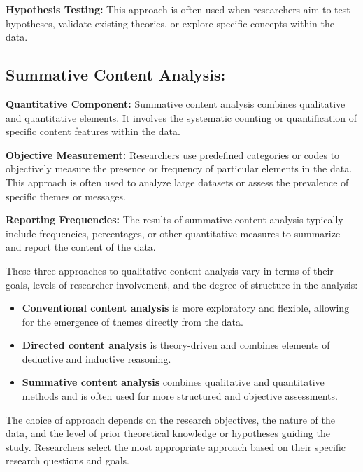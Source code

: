 \documentclass[
  b5paper]{book}
\begin{document}
\textbf{Hypothesis Testing:} This approach is often used when researchers aim to test hypotheses, validate existing theories, or explore specific concepts within the data.

\hypertarget{summative-content-analysis}{%
\subsection*{\texorpdfstring{\textbf{Summative Content Analysis:}}{Summative Content Analysis:}}\label{summative-content-analysis}}

\textbf{Quantitative Component:} Summative content analysis combines qualitative and quantitative elements. It involves the systematic counting or quantification of specific content features within the data.

\textbf{Objective Measurement:} Researchers use predefined categories or codes to objectively measure the presence or frequency of particular elements in the data. This approach is often used to analyze large datasets or assess the prevalence of specific themes or messages.

\textbf{Reporting Frequencies:} The results of summative content analysis typically include frequencies, percentages, or other quantitative measures to summarize and report the content of the data.

These three approaches to qualitative content analysis vary in terms of their goals, levels of researcher involvement, and the degree of structure in the analysis:

\begin{itemize}
\item
  \textbf{Conventional content analysis} is more exploratory and flexible, allowing for the emergence of themes directly from the data.
\item
  \textbf{Directed content analysis} is theory-driven and combines elements of deductive and inductive reasoning.
\item
  \textbf{Summative content analysis} combines qualitative and quantitative methods and is often used for more structured and objective assessments.
\end{itemize}

The choice of approach depends on the research objectives, the nature of the data, and the level of prior theoretical knowledge or hypotheses guiding the study. Researchers select the most appropriate approach based on their specific research questions and goals.
\end{document}
